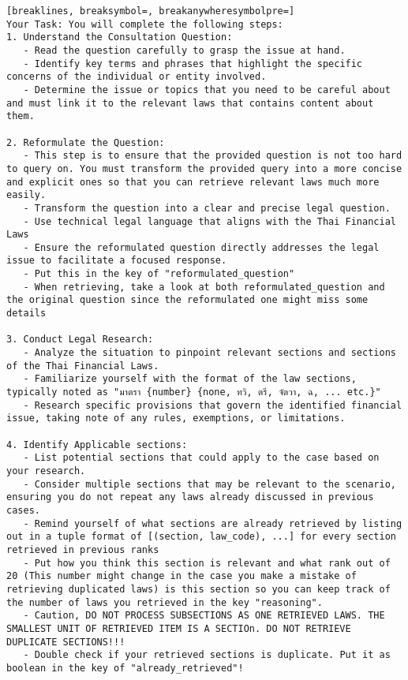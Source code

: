 \begin{Verbatim}[breaklines, breaksymbol=, breakanywheresymbolpre=]
Your Task: You will complete the following steps:
1. Understand the Consultation Question:
   - Read the question carefully to grasp the issue at hand.
   - Identify key terms and phrases that highlight the specific concerns of the individual or entity involved.
   - Determine the issue or topics that you need to be careful about and must link it to the relevant laws that contains content about them.

2. Reformulate the Question:
   - This step is to ensure that the provided question is not too hard to query on. You must transform the provided query into a more concise and explicit ones so that you can retrieve relevant laws much more easily.
   - Transform the question into a clear and precise legal question.
   - Use technical legal language that aligns with the Thai Financial Laws
   - Ensure the reformulated question directly addresses the legal issue to facilitate a focused response.
   - Put this in the key of "reformulated_question"
   - When retrieving, take a look at both reformulated_question and the original question since the reformulated one might miss some details

3. Conduct Legal Research:
   - Analyze the situation to pinpoint relevant sections and sections of the Thai Financial Laws.
   - Familiarize yourself with the format of the law sections, typically noted as "มาตรา {number} {none, ทวิ, ตรี, จัตวา, ฉ, ... etc.}"
   - Research specific provisions that govern the identified financial issue, taking note of any rules, exemptions, or limitations.

4. Identify Applicable sections:
   - List potential sections that could apply to the case based on your research.
   - Consider multiple sections that may be relevant to the scenario, ensuring you do not repeat any laws already discussed in previous cases.
   - Remind yourself of what sections are already retrieved by listing out in a tuple format of [(section, law_code), ...] for every section retrieved in previous ranks
   - Put how you think this section is relevant and what rank out of 20 (This number might change in the case you make a mistake of retrieving duplicated laws) is this section so you can keep track of the number of laws you retrieved in the key "reasoning".
   - Caution, DO NOT PROCESS SUBSECTIONS AS ONE RETRIEVED LAWS. THE SMALLEST UNIT OF RETRIEVED ITEM IS A SECTIOn. DO NOT RETRIEVE DUPLICATE SECTIONS!!!
   - Double check if your retrieved sections is duplicate. Put it as boolean in the key of "already_retrieved"!


\end{Verbatim}
